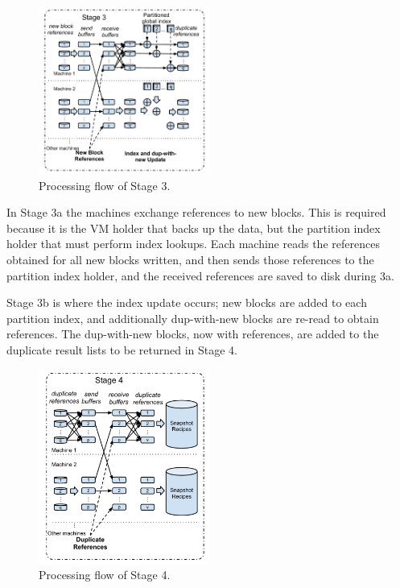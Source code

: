 \begin{figure}[th]
\centering
\includegraphics[width=0.5\textwidth]{images/Stage3.pdf}
\caption{Processing flow of Stage 3.}
\label{fig:stage3}
\end{figure}

In Stage 3a the machines exchange references to new blocks. This is required
because it is the VM holder that backs up the data, but the partition index
holder that must perform index lookups. Each machine reads the references
obtained for all new blocks written, and then sends those references to the
partition index holder, and the received references are saved to disk during 3a.

Stage 3b is where the index update occurs; new blocks are added to each
partition index, and additionally dup-with-new blocks are re-read to obtain
references. The dup-with-new blocks, now with references, are added to the
duplicate result lists to be returned in Stage 4.

\begin{figure}[th]
\centering
\includegraphics[width=0.5\textwidth]{images/Stage4.pdf}
\caption{Processing flow of Stage 4.}
\label{fig:stage4}
\end{figure}

